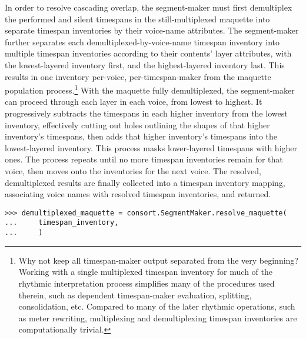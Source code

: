 \noindent In order to resolve cascading overlap, the segment-maker must first
demultiplex the performed and silent timespans in the still-multiplexed
maquette into separate timespan inventories by their voice-name attributes. The
segment-maker further separates each demultiplexed-by-voice-name timespan
inventory into multiple timespan inventories according to their contents' layer
attributes, with the lowest-layered inventory first, and the highest-layered
inventory last. This results in one inventory per-voice, per-timespan-maker
from the maquette population process.\footnote{Why not keep all timespan-maker
output separated from the very beginning? Working with a single multiplexed
timespan inventory for much of the rhythmic interpretation process simplifies
many of the procedures used therein, such as dependent timespan-maker
evaluation, splitting, consolidation, etc. Compared to many of the later
rhythmic operations, such as meter rewriting, multiplexing and demultiplexing
timespan inventories are computationally trivial.} With the maquette fully
demultiplexed, the segment-maker can proceed through each layer in each voice,
from lowest to highest. It progressively subtracts the timespans in each higher
inventory from the lowest inventory, effectively cutting out holes outlining
the shapes of that higher inventory's timespans, then adds that higher
inventory's timespans into the lowest-layered inventory. This process masks
lower-layered timespans with higher ones. The process repeats until no more
timespan inventories remain for that voice, then moves onto the inventories for
the next voice. The resolved, demultiplexed results are finally collected into
a timespan inventory mapping, associating voice names with resolved timespan
inventories, and returned.

\begin{comment}
<abjad>
demultiplexed_maquette = consort.SegmentMaker.resolve_maquette(
    timespan_inventory,
    )
</abjad>
\end{comment}

\begin{abjadbookoutput}
\begin{singlespacing}
\vspace{-0.5\baselineskip}
\begin{lstlisting}
>>> demultiplexed_maquette = consort.SegmentMaker.resolve_maquette(
...     timespan_inventory,
...     )
\end{lstlisting}
\end{singlespacing}
\end{abjadbookoutput}

